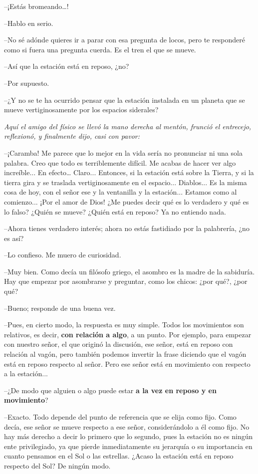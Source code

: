 {{  --¡Estás bromeando…!
   
  --Hablo en serio.
   
  --No sé adónde quieres ir a parar con esa pregunta de locos, pero te responderé como si fuera una pregunta cuerda. Es el tren el que se mueve.
   
  --Así que la estación está en reposo, ¿no?
   
  --Por supuesto.
   
  --¿Y no se te ha ocurrido pensar que la estación instalada en un planeta que se mueve vertiginosamente por los espacios siderales?

   {\it Aquí el amigo del físico se llevó la mano derecha al mentón, frunció el entrecejo, reflexionó, y finalmente dijo, casi con pavor:}
   
  --¡Caramba! Me parece que lo mejor en la vida sería no pronunciar ni una sola palabra. Creo que todo es terriblemente difícil. Me acabas de hacer ver algo increíble... En efecto… Claro... Entonces, si la estación está sobre la Tierra, y si la tierra gira y se traslada vertiginosamente en el espacio... Diablos... Es la misma cosa de hoy, con el señor ese y la ventanilla y la estación... Estamos como al comienzo... ¡Por el amor de Dios! ¿Me puedes decir qué es lo verdadero y qué es lo falso? ¿Quién se mueve? ¿Quién está en reposo? Ya no entiendo nada.
   
  --Ahora tienes verdadero interés; ahora no estás fastidiado por la palabrería, ¿no es así?
   
  --Lo confieso. Me muero de curiosidad.
   
  --Muy bien. Como decía un filósofo griego, el asombro es la madre de la sabiduría. Hay que empezar por asombrarse y preguntar, como los chicos: ¿por qué?, ¿por qué?
   
  --Bueno; responde de una buena vez.
   
  --Pues, en cierto modo, la respuesta es muy simple. Todos los movimientos son relativos, es decir, {\bf con relación a algo}, a un punto. Por ejemplo, para empezar con nuestro señor, el que originó la discusión, ese señor, está en reposo con relación al vagón, pero también podemos invertir la frase diciendo que el vagón está en reposo respecto al señor. Pero ese señor está en movimiento con respecto a la estación...
   
  --¿De modo que alguien o algo puede estar {\bf a la vez en reposo y en movimiento}?
   
  --Exacto. Todo depende del punto de referencia que se elija como fijo. Como decía, ese señor se mueve respecto a ese señor, considerándolo a él como fijo. No hay más derecho a decir lo primero que lo segundo, pues la estación no es ningún ente privilegiado, ya que pierde inmediatamente su jerarquía o su importancia en cuanto pensamos en el Sol o las estrellas. ¿Acaso la estación está en reposo respecto del Sol? De ningún modo.
   
}}
